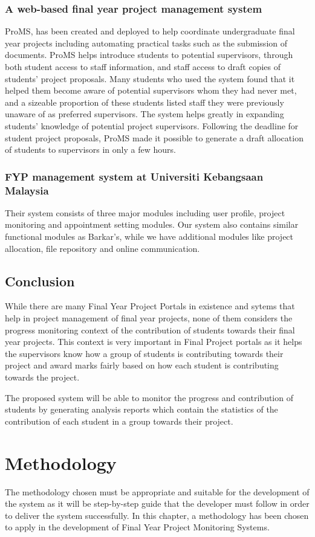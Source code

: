 \documentclass{article}
\begin{document}
\subsubsection{A web-based final year project management system}
	ProMS, has been created and deployed to help coordinate undergraduate final year projects including automating practical tasks such as the submission of documents. ProMS helps introduce students to potential supervisors, through both student access to staff information, and staff access to draft copies of students’ project proposals. Many students who used the system found that it helped them become aware of potential supervisors whom they had never met, and a sizeable proportion of these students listed staff they were previously unaware of as preferred supervisors. The system helps greatly in expanding students’ knowledge of potential project supervisors. Following the deadline for student project proposals, ProMS made it possible to generate a draft allocation of students to supervisors in only a few hours.\cite{clementmaking}
\subsubsection{FYP management system at Universiti Kebangsaan Malaysia}
Their system consists of three major modules including user profile, project monitoring and appointment setting modules. Our system also contains similar functional modules as Barkar’s, while we have additional modules like project allocation, file repository and online communication.\cite{article}
\subsection{Conclusion}
While there are many Final Year Project Portals in existence and sytems that help in project management of final year projects, none of them considers the progress monitoring context of the contribution of students towards their final year projects. This context is very important in Final Project portals as it helps the supervisors know how a group of students is contributing towards their project and award marks fairly based on how each student is contributing towards the project.
\par The proposed system will be able to monitor the progress and contribution of students by generating analysis reports which contain the statistics of the contribution of each student in a group towards their project.
\section{Methodology}
The methodology chosen must be appropriate and suitable for the development
of the system as it will be step-by-step guide that the developer must follow
in order to deliver the system successfully. In this chapter, a methodology has
been chosen to apply in the development of Final Year Project Monitoring
Systems.
\end{document}
